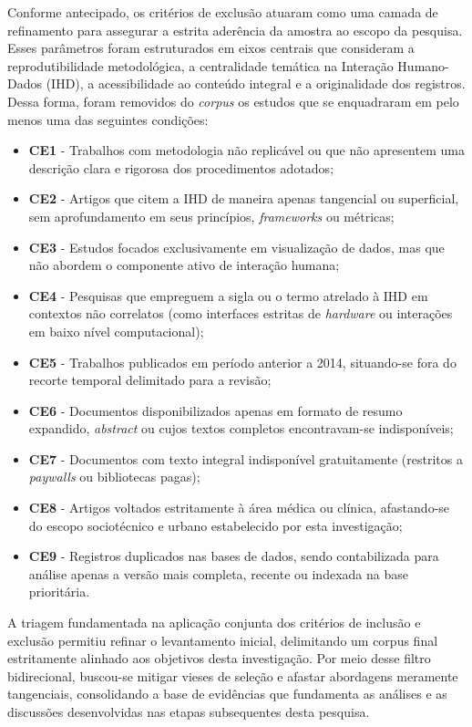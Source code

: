 \documentclass[
	12pt,				%
	oneside,			%
	a4paper,			%
	english,			%
	brazil				%
	]{abntex2ppgsi}
\begin{document}
    Conforme antecipado, os critérios de exclusão atuaram como uma camada de refinamento para assegurar a estrita aderência da amostra ao escopo da pesquisa. Esses parâmetros foram estruturados em eixos centrais que consideram a reprodutibilidade metodológica, a centralidade temática na Interação Humano-Dados (IHD), a acessibilidade ao conteúdo integral e a originalidade dos registros. Dessa forma, foram removidos do \textit{corpus} os estudos que se enquadraram em pelo menos uma das seguintes condições:

\begin{itemize}
    \item[] \textbf{CE1} - Trabalhos com metodologia não replicável ou que não apresentem uma descrição clara e rigorosa dos procedimentos adotados;
    \item[] \textbf{CE2} - Artigos que citem a IHD de maneira apenas tangencial ou superficial, sem aprofundamento em seus princípios, \textit{frameworks} ou métricas;
    \item[] \textbf{CE3} - Estudos focados exclusivamente em visualização de dados, mas que não abordem o componente ativo de interação humana;
    \item[] \textbf{CE4} - Pesquisas que empreguem a sigla ou o termo atrelado à IHD em contextos não correlatos (como interfaces estritas de \textit{hardware} ou interações em baixo nível computacional);
    \item[] \textbf{CE5} - Trabalhos publicados em período anterior a 2014, situando-se fora do recorte temporal delimitado para a revisão;
    \item[] \textbf{CE6} - Documentos disponibilizados apenas em formato de resumo expandido, \textit{abstract} ou cujos textos completos encontravam-se indisponíveis;
    \item[] \textbf{CE7} - Documentos com texto integral indisponível gratuitamente (restritos a \textit{paywalls} ou bibliotecas pagas);
    \item[] \textbf{CE8} - Artigos voltados estritamente à área médica ou clínica, afastando-se do escopo sociotécnico e urbano estabelecido por esta investigação;
    \item[] \textbf{CE9} - Registros duplicados nas bases de dados, sendo contabilizada para análise apenas a versão mais completa, recente ou indexada na base prioritária.
\end{itemize}

    A triagem fundamentada na aplicação conjunta dos critérios de inclusão e exclusão permitiu refinar o levantamento inicial, delimitando um corpus final estritamente alinhado aos objetivos desta investigação. Por meio desse filtro bidirecional, buscou-se mitigar vieses de seleção e afastar abordagens meramente tangenciais, consolidando a base de evidências que fundamenta as análises e as discussões desenvolvidas nas etapas subsequentes desta pesquisa.
\end{document}
